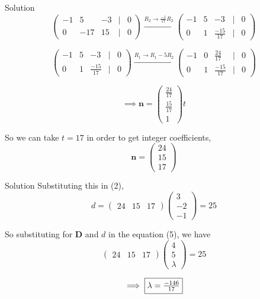 \documentclass{beamer}
\let\vec\mathbf
\theoremstyle{remark}
\newcommand{\myvec}[1]{\ensuremath{\begin{pmatrix}#1\end{pmatrix}}}
\begin{document}
\begin{frame}{Solution}
\begin{equation}
    \myvec{-1&5&-3&|&0\\0&-17&15&|&0} \overset{R_2 \rightarrow \frac{-1}{17}R_2}{\longrightarrow} \myvec{-1&5&-3&|&0\\0&1&\frac{-15}{17}&|&0}
\end{equation}

\begin{equation}
    \myvec{-1&5&-3&|&0\\0&1&\frac{-15}{17}&|&0} \overset{R_1 \rightarrow R_1 - 5R_2}{\longrightarrow} \myvec{-1&0&\frac{24}{17}&|&0\\0&1&\frac{-15}{17}&|&0}
\end{equation}

\begin{equation}
    \implies \vec{n} = \myvec{\frac{24}{17}\\ \frac{15}{17}\\ 1} t
\end{equation}

So we can take $t=17$ in order to get integer coefficients,
\begin{equation}
    \vec{n} = \myvec{24\\15\\17}
\end{equation}

\end{frame}

\begin{frame}{Solution}
Substituting this in (2),
\begin{equation}
    d = \myvec{24&15&17}\myvec{3\\-2\\-1} = 25
\end{equation}

So substituting for $\vec{D}$ and $d$ in the equation (5), we have
\begin{equation}
    \myvec{24&15&17}\myvec{4\\5\\\lambda} = 25
\end{equation}

\begin{equation}
    \implies \fbox{$\lambda = \frac{-146}{17}$}
\end{equation}
\end{frame}
\end{document}
